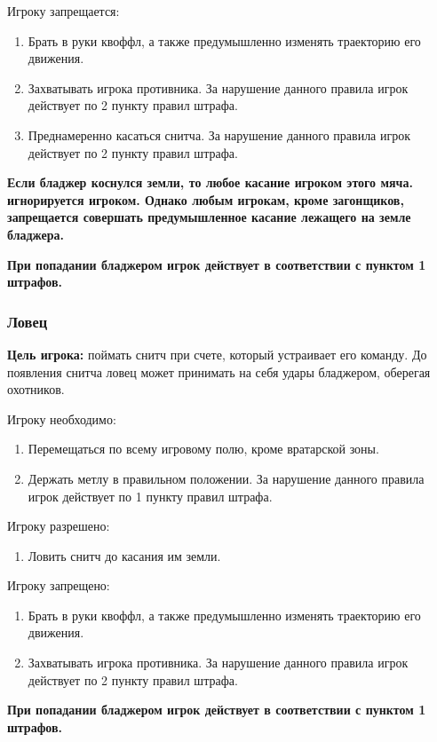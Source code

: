 \par Игроку запрещается:
\begin{enumerate}
\item Брать в руки квоффл, а также предумышленно изменять траекторию его движения.
\item Захватывать игрока противника. За нарушение данного правила игрок действует по 2 пункту правил штрафа.
\item Преднамеренно касаться снитча. За нарушение данного правила игрок действует по 2 пункту правил штрафа.
\end{enumerate}

\par\textbf{Если бладжер коснулся земли, то любое касание игроком этого мяча. игнорируется игроком. Однако любым игрокам, кроме загонщиков, запрещается совершать предумышленное касание лежащего на земле бладжера.}
\par\textbf{При попадании бладжером игрок действует в соответствии с пунктом 1 штрафов.}


\subsubsection*{Ловец}
\par\textbf{Цель игрока:} поймать снитч при счете, который устраивает его команду. До появления снитча ловец может принимать на себя удары бладжером, оберегая охотников.
\par Игроку необходимо:
\begin{enumerate}
\item Перемещаться по всему игровому полю, кроме вратарской зоны.
\item Держать метлу в правильном положении. За нарушение данного правила игрок действует по 1 пункту правил штрафа.
\end{enumerate}

\par Игроку разрешено:
\begin{enumerate}
\item Ловить снитч до касания им земли.
\end{enumerate}

\par Игроку запрещено:
\begin{enumerate}
\item Брать в руки квоффл, а также предумышленно изменять траекторию его движения.
\item Захватывать игрока противника. За нарушение данного правила игрок действует по 2 пункту правил штрафа.
\end{enumerate}

\par\textbf{При попадании бладжером игрок действует в соответствии с пунктом 1 штрафов.}